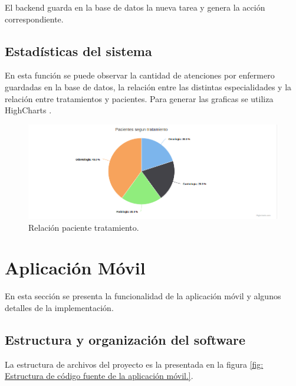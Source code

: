 El backend guarda en la base de datos la nueva tarea y genera la acción correspondiente.

\subsection{Estadísticas del sistema}

En esta función se puede observar la cantidad de atenciones por enfermero guardadas en la base de datos, la relación entre las distintas especialidades y la relación entre tratamientos y pacientes. Para generar las graficas se utiliza HighCharts \citep{WEBSITE:33}. 
\begin{figure}[ht]
	\centering
	\includegraphics[scale=.40]{./Figures/web/pacientes-Tratamiento.png}
	\caption{Relación paciente tratamiento.}
	\label{fig:Relación paciente tratamiento.}
\end{figure} 


\pagebreak
\section{Aplicación Móvil}
\label{Aplicación Móvil}
En esta sección se presenta la funcionalidad de la aplicación móvil y algunos detalles de la implementación.
\label{Estructura y organización del software}
\subsection{Estructura y organización del software}
La estructura de archivos del proyecto es la presentada en la figura \ref{fig: Estructura de código fuente de la aplicación móvil.}.

